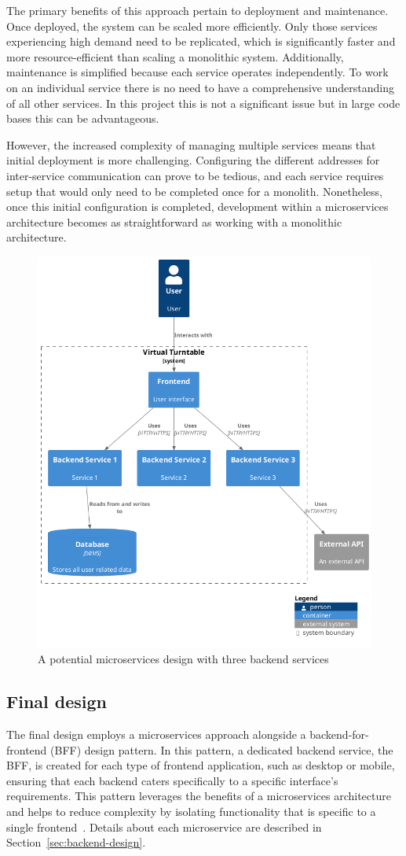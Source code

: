 The primary benefits of this approach pertain to deployment and maintenance. Once deployed, the system can be scaled more efficiently. Only those services experiencing high demand need to be replicated, which is significantly faster and more resource-efficient than scaling a monolithic system. Additionally, maintenance is simplified because each service operates independently. To work on an individual service there is no need to have a comprehensive understanding of all other services. In this project this is not a significant issue but in large code bases this can be advantageous.

However, the increased complexity of managing multiple services means that initial deployment is more challenging. Configuring the different addresses for inter-service communication can prove to be tedious, and each service requires setup that would only need to be completed once for a monolith. Nonetheless, once this initial configuration is completed, development within a microservices architecture becomes as straightforward as working with a monolithic architecture.

\begin{figure} [H]
    \centering
    \includegraphics[width=0.5\linewidth]{figures/microservices_arch.png}
    \caption{A potential microservices design with three backend services}
    \label{fig:microservices-arch}
\end{figure}

\subsection{Final design}
The final design employs a microservices approach alongside a backend-for-frontend (BFF) design pattern. In this pattern, a dedicated backend service, the BFF, is created for each type of frontend application, such as desktop or mobile, ensuring that each backend caters specifically to a specific interface’s requirements. This pattern leverages the benefits of a microservices architecture and helps to reduce complexity by isolating functionality that is specific to a single frontend~\cite{BFF}. Details about each microservice are described in Section~\ref{sec:backend-design}.

